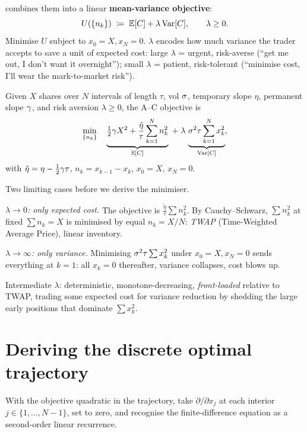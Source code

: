 \citeAC{} combines them into a linear \textbf{mean-variance
objective}:
\begin{equation}
  U(\{n_k\}) \;\coloneqq\; \mathbb{E}[C] + \lambda\operatorname{Var}[C],
  \qquad \lambda \ge 0.
  \label{eq:ac_obj}
\end{equation}
Minimise $U$ subject to $x_0 = X, x_N = 0$. $\lambda$ encodes
how much variance the trader accepts to save a unit of expected
cost: large $\lambda$ = urgent, risk-averse (``get me out, I don't
want it overnight''); small $\lambda$ = patient, risk-tolerant
(``minimise cost, I'll wear the mark-to-market risk'').

\begin{keyfactbox}
Given $X$ shares over $N$ intervals of length $\tau$, vol $\sigma$,
temporary slope $\eta$, permanent slope $\gamma$, and risk
aversion $\lambda \ge 0$, the A--C objective is
\[
  \min_{\{n_k\}}\quad
    \underbrace{\tfrac{1}{2}\gamma X^2 + \frac{\tilde\eta}{\tau}\sum_{k=1}^N n_k^2}_{\mathbb{E}[C]}
    \;+\;
    \lambda\,
    \underbrace{\sigma^2\tau\sum_{k=1}^N x_k^2}_{\operatorname{Var}[C]},
\]
with $\tilde\eta = \eta - \tfrac{1}{2}\gamma\tau$,
$n_k = x_{k-1} - x_k$, $x_0 = X$, $x_N = 0$.
\end{keyfactbox}

\begin{intuitionbox}
Two limiting cases before we derive the minimiser.

\textit{$\lambda \to 0$: only expected cost.} The objective is
$\tfrac{\tilde\eta}{\tau}\sum n_k^2$. By Cauchy--Schwarz, $\sum
n_k^2$ at fixed $\sum n_k = X$ is minimised by equal $n_k = X/N$:
\emph{TWAP} (Time-Weighted Average Price), linear inventory.

\textit{$\lambda \to \infty$: only variance.} Minimising
$\sigma^2\tau\sum x_k^2$ under $x_0=X, x_N=0$ sends everything at
$k=1$: all $x_k = 0$ thereafter, variance collapses, cost blows up.

Intermediate $\lambda$: deterministic, monotone-decreasing,
\emph{front-loaded} relative to TWAP, trading some expected
cost for variance reduction by shedding the large early positions
that dominate $\sum x_k^2$.
\end{intuitionbox}

\section{Deriving the discrete optimal trajectory}
\label{sec:ac_derivation}

With the objective quadratic in the trajectory, take $\partial/
\partial x_j$ at each interior $j \in \{1, \ldots, N-1\}$, set to
zero, and recognise the finite-difference equation as a
second-order linear recurrence.

